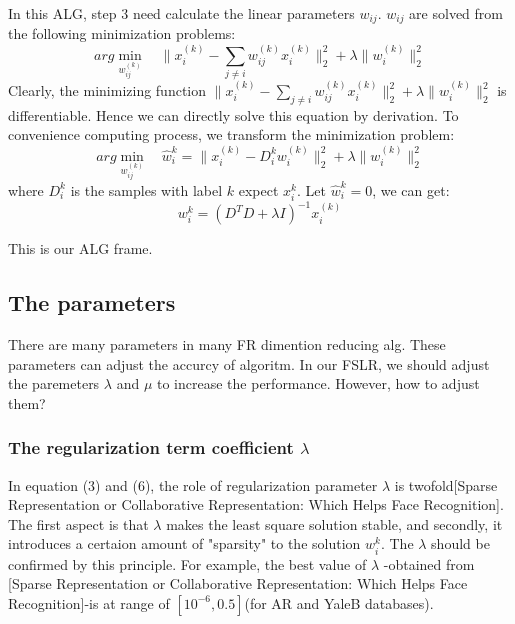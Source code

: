 \documentclass[10pt,journal,final,twocolumn,]{IEEEtran}
\begin{document}
	In this ALG, step 3 need calculate the linear parameters $w_{ij}$. $w_{ij}$ are solved from the following minimization problems:
	\begin{equation}
	arg\min_{w_{ij}^{(k)}} \quad \parallel x_{i}^{(k)}- \sum_{j \neq i} w_{ij}^{(k)}x_{i}^{(k)} \parallel_{2}^{2} + \lambda \parallel w_{i}^{(k)} \parallel_{2}^{2}
	\end{equation}
	Clearly, the minimizing function $\parallel x_{i}^{(k)}- \sum_{j \neq i} w_{ij}^{(k)}x_{i}^{(k)} \parallel_{2}^{2} + \lambda \parallel w_{i}^{(k)} \parallel_{2}^{2}$ is differentiable. Hence we can directly solve this equation by derivation. To convenience computing process, we transform the minimization problem:
	\begin{equation}
	arg\min_{w_{ij}^{(k)}} \quad {\hat{w}}_{i}^{k} = \parallel x_{i}^{(k)}- D_{i}^{k} w_{i}^{(k)} \parallel_{2}^{2} + \lambda \parallel w_{i}^{(k)} \parallel_{2}^{2}
	\end{equation}
	where $D_{i}^{k}$ is the samples with label $k$ expect $x_{i}^{k}$. Let ${\hat{w}}_{i}^{k} = 0$, we can get:
	\begin{equation}
	w_{i}^{k}=(D^{T}D+\lambda I)^{-1}x_{i}^{(k)}
	\end{equation}
	
	This is our ALG frame.
	
	
	\subsection{\textbf{The parameters}}
	There are many parameters in many FR dimention reducing alg. These parameters can adjust the accurcy of algoritm. In our FSLR, we should adjust the paremeters $\lambda$ and $\mu$ to increase the performance. However, how to adjust them?
	
	\subsubsection{\textbf{The regularization term coefficient $\lambda$}}
	In equation (3) and (6), the role of regularization parameter $\lambda$ is twofold[Sparse Representation or Collaborative Representation: Which Helps Face Recognition]. The first aspect is that $\lambda$ makes the least square solution stable, and secondly, it introduces a certaion amount of "sparsity" to the solution $w_{i}^{k}$. The $\lambda$ should be confirmed by this principle. For example, the best value of $\lambda$ -obtained from [Sparse Representation or Collaborative Representation: Which Helps Face Recognition]-is at range of $[10^{-6}, 0.5]$(for AR and YaleB databases).
	
\end{document}
